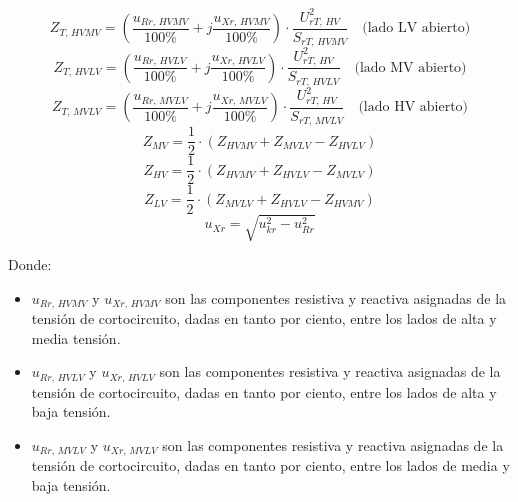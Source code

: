 \begin{itemize}
                \begin{equation}
                    Z_\textit{T, HVMV} = \left(\dfrac{u_\textit{Rr, HVMV}}{100\!\text{\%}} + j\dfrac{u_\textit{Xr, HVMV}}{100\!\text{\%}} \right)\cdot \dfrac{U_\textit{rT, HV}^2}{S_\textit{rT, HVMV}}\quad\text{(lado LV abierto)}
                \end{equation}
                \begin{equation}
                    Z_\textit{T, HVLV} = \left(\dfrac{u_\textit{Rr, HVLV}}{100\!\text{\%}} + j\dfrac{u_\textit{Xr, HVLV}}{100\!\text{\%}} \right)\cdot \dfrac{U_\textit{rT, HV}^2}{S_\textit{rT, HVLV}}\quad\text{(lado MV abierto)}
                \end{equation}
                \begin{equation}
                    Z_\textit{T, MVLV} = \left(\dfrac{u_\textit{Rr, MVLV}}{100\!\text{\%}} + j\dfrac{u_\textit{Xr, MVLV}}{100\!\text{\%}} \right)\cdot \dfrac{U_\textit{rT, HV}^2}{S_\textit{rT, MVLV}}\quad\text{(lado HV abierto)}
                \end{equation}
                \begin{equation}
                    Z_\textit{MV} = \dfrac{1}{2}\cdot (Z_\textit{HVMV} + Z_\textit{MVLV} - Z_\textit{HVLV})
                \end{equation}
                \begin{equation}
                    Z_\textit{HV} = \dfrac{1}{2}\cdot (Z_\textit{HVMV} + Z_\textit{HVLV} - Z_\textit{MVLV})
                \end{equation}
                \begin{equation}
                    Z_\textit{LV} = \dfrac{1}{2}\cdot (Z_\textit{MVLV} + Z_\textit{HVLV} - Z_\textit{HVMV})
                \end{equation}
                \begin{equation}
                    u_\textit{Xr} = \sqrt{u_\textit{kr}^2-u_\textit{Rr}^2}
                \end{equation}

                Donde:
                \begin{itemize}
                    \item $u_\textit{Rr, HVMV}$ y $u_\textit{Xr, HVMV}$ son las componentes resistiva y reactiva asignadas de la tensión de cortocircuito, dadas en tanto por ciento, entre los lados de alta y media tensión.
                    \item $u_\textit{Rr, HVLV}$ y $u_\textit{Xr, HVLV}$ son las componentes resistiva y reactiva asignadas de la tensión de cortocircuito, dadas en tanto por ciento, entre los lados de alta y baja tensión.
                    \item $u_\textit{Rr, MVLV}$ y $u_\textit{Xr, MVLV}$ son las componentes resistiva y reactiva asignadas de la tensión de cortocircuito, dadas en tanto por ciento, entre los lados de media y baja tensión.
                \end{itemize}
            

\end{itemize}
